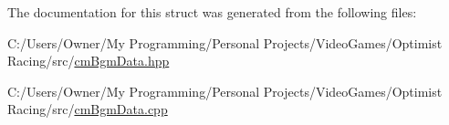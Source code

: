 The documentation for this struct was generated from the following files\-:\begin{DoxyCompactItemize}
\item 
C\-:/\-Users/\-Owner/\-My Programming/\-Personal Projects/\-Video\-Games/\-Optimist Racing/src/\hyperlink{cm_bgm_data_8hpp}{cm\-Bgm\-Data.\-hpp}\item 
C\-:/\-Users/\-Owner/\-My Programming/\-Personal Projects/\-Video\-Games/\-Optimist Racing/src/\hyperlink{cm_bgm_data_8cpp}{cm\-Bgm\-Data.\-cpp}\end{DoxyCompactItemize}
